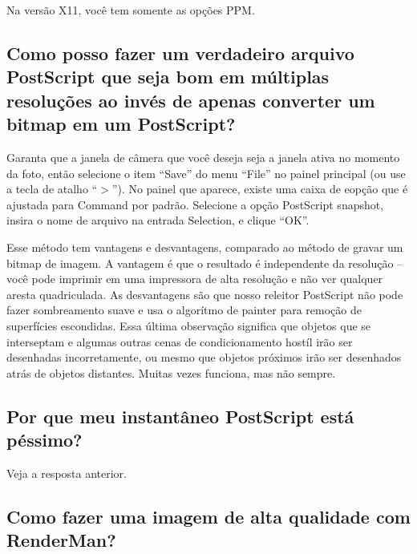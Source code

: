 \documentclass[12pt,a4paper]{article}
\begin{document}
        Na vers\~ao X11, voc\^e tem somente as op\c{c}\~oes PPM.

    \subsection{Como posso fazer um verdadeiro arquivo PostScript que seja bom em m\'ultiplas resolu\c{c}\~oes ao inv\'es de apenas converter um bitmap em um PostScript?}

        Garanta que a janela de c\^amera que voc\^e deseja seja a janela ativa no momento da foto, ent\~ao selecione
        o item ``Save'' do menu ``File'' no painel principal (ou use a tecla de atalho
        ``$>$''). No painel que aparece, existe uma caixa de eop\c{c}\~ao que \'e ajustada para
        Command por padr\~ao. Selecione a op\c{c}\~ao PostScript snapshot, insira o
        nome de arquivo na entrada Selection, e clique ``OK''.

        Esse m\'etodo tem vantagens e desvantagens, comparado ao m\'etodo de gravar um
        bitmap de imagem. A vantagem \'e que o resultado \'e independente da resolu\c{c}\~ao
        -- voc\^e pode imprimir em uma impressora de alta resolu\c{c}\~ao e n\~ao ver qualquer aresta
        quadriculada. As desvantagens s\~ao que nosso releitor PostScript n\~ao pode fazer
        sombreamento suave e usa o algor\'itmo de painter para remo\c{c}\~ao de superf\'icies
        escondidas. Essa \'ultima observa\c{c}\~ao significa que objetos que se interseptam e algumas outras
        cenas de condicionamento host\'il ir\~ao ser desenhadas incorretamente, ou mesmo que objetos
        pr\'{o}ximos ir\~ao ser desenhados atr\'as de objetos distantes. Muitas vezes funciona, mas n\~ao
        sempre.

    \subsection{Por que meu instant\^aneo PostScript est\'a p\'essimo?}

        Veja a resposta anterior.

    \subsection{Como fazer uma imagem de alta qualidade com RenderMan?}
\end{document}
